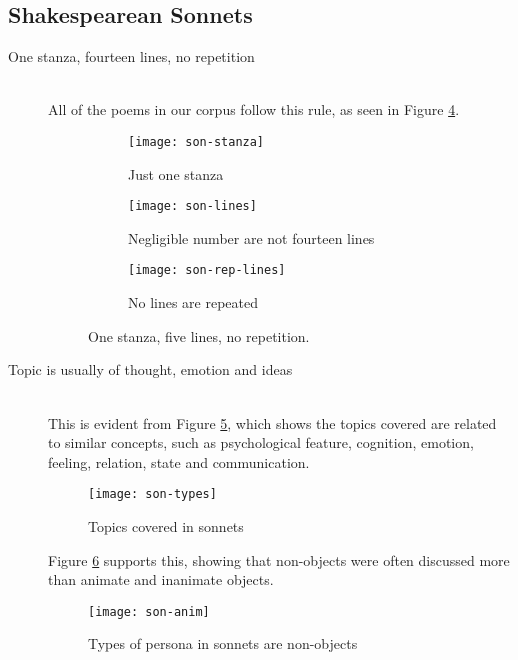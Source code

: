 \subsection{Shakespearean Sonnets}

\begin{description}
\item[One stanza, fourteen lines, no repetition]  \hfill \\
All of the poems in our corpus follow this rule, as seen in Figure \ref{fig:son1}.

\begin{figure}[H]
\centering
\begin{subfigure}[t]{0.3\textwidth}
	\centering
    \texttt{[image: son-stanza]}
    \caption{Just one stanza}
    \label{fig:son-stanza}
\end{subfigure}
\begin{subfigure}[t]{0.3\textwidth}
	\centering
    \texttt{[image: son-lines]}
    \caption{Negligible number are not fourteen lines}
    \label{fig:son-lines}
\end{subfigure}
\begin{subfigure}[t]{0.3\textwidth}
	\centering
    \texttt{[image: son-rep-lines]}
    \caption{No lines are repeated}
    \label{fig:son-rep-lines}
\end{subfigure}
\caption{One stanza, five lines, no repetition.}
\label{fig:son1}
\end{figure}

\item[Topic is usually of thought, emotion and ideas]  \hfill \\
This is evident from Figure \ref{fig:son-types}, which shows the topics covered are related to similar concepts, such as psychological feature, cognition, emotion, feeling, relation, state and communication.

\begin{figure}[H]
\centering
\texttt{[image: son-types]}
\caption{Topics covered in sonnets}
\label{fig:son-types}
\end{figure}

Figure \ref{fig:son-anim} supports this, showing that non-objects were often discussed more than animate and inanimate objects.

\begin{figure}[H]
\centering
\texttt{[image: son-anim]}
\caption{Types of persona in sonnets are non-objects}
\label{fig:son-anim}
\end{figure}


\end{description}
